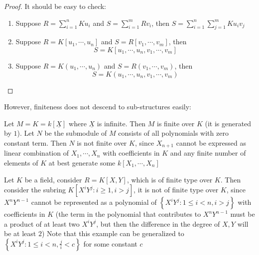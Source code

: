 \documentclass{note-eng}
\begin{document}
\begin{proof}
    It should be easy to check:
    \begin{enumerate}
        \item Suppose $R = \sum\limits_{i = 1}^{n} K u_i$ and $S = \sum\limits_{i = 1}^{m} R v_i$, then $S = \sum\limits_{i = 1}^{n} \sum\limits_{j = 1}^{m} Ku_iv_j$
        \item Suppose $R = K[u_1, \cdots, u_n]$ and $S = R[v_1, \cdots, v_m]$, then 
        $$S = K[u_1, \cdots, u_n, v_1, \cdots, v_m]$$
        \item Suppose $R = K(u_1, \cdots, u_n)$ and $S = R(v_1, \cdots, v_m)$, then
        $$S = K(u_1, \cdots, u_n, v_1, \cdots, v_m)$$
    \end{enumerate}
\end{proof}

However, finiteness does not descend to sub-structures easily:

\begin{example}
    Let $M = K = k[\underline{X}]$ where $\underline{X}$ is infinite. Then $M$ is finite over $K$ (it is generated by $1$). Let $N$ be the submodule of $M$ consists of all polynomials with zero constant term. Then $N$ is not finite over $K$, since $X_{n + 1}$ cannot be expressed as linear combination of $X_1, \cdots, X_n$ with coefficients in $K$ and any finite number of elements of $K$ at best generate some $k[X_1, \cdots, X_n]$
\end{example}

\begin{example} \label{exp:subalgebra-not-fg}
    Let $K$ be a field, consider $R = K[X, Y]$, which is of finite type over $K$. Then consider the subring $K[X^iY^j: i \ge 1, i \gt j]$, it is not of finite type over $K$, since $X^nY^{n - 1}$ cannot be represented as a polynomial of $\left\lbrace X^iY^j: 1 \le i \lt n, i \gt j \right\rbrace$ with coefficients in $K$ (the term in the polynomial that contributes to $X^nY^{n - 1}$ must be a product of at least two $X^iY^j$, but then the difference in the degree of $X, Y$ will be at least $2$) Note that this example can be generalized to $\left\lbrace X^iY^j: 1 \le i \lt n, \frac{j}{i} \lt c \right\rbrace$ for some constant $c$
\end{example}

\iffalse
\begin{example} \label{exp:finiteness-not-descend}
    \begin{enumerate}
        \item Subring of a ring $R$ finite over $K$ may bot be finite over $K$: \TODO
        \item Subfield of finitely-generated field extension may not be a finitely-generated field extension. \TODO 
    \end{enumerate}
\end{example}
\fi
\end{document}
